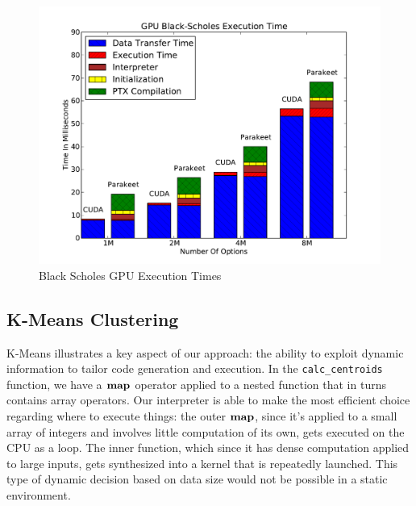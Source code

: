 \documentclass[preprint]{sigplanconf}
\begin{document}
\begin{figure}
\includegraphics[scale=0.45]{BSNOCPU.pdf}
\caption{Black Scholes GPU Execution Times}
\label{BSGPU}
\end{figure}

\subsection{K-Means Clustering}
\label{results-k-means}

K-Means illustrates a key aspect of our approach: the ability to exploit dynamic information to tailor code generation and execution.  In the \texttt{calc\_centroids} function, we have a $\mbox{\textbf{map}}$ operator applied to a
nested function that in turns contains array operators.  Our interpreter is able to make the most efficient choice regarding where to execute things: the outer $\mbox{\textbf{map}}$, since it's applied to a small array of integers and involves little computation of its own, gets executed on the CPU as a loop.  The inner function, which since it has dense computation applied to large inputs, gets synthesized into a kernel that is repeatedly launched.  This type of dynamic decision based on data size would not be possible in a static environment.
\end{document}
